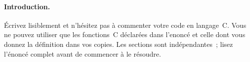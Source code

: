 \documentclass[ds]{sujet}
\begin{document}
\formation{} 
\matiere{}  
\auteur{} 
\def\SujetClsNumero{}
\paragraph{Introduction.}
\'Ecrivez lisiblement et n'h\'esitez pas \`a commenter votre code en
langage~C. 
Vous ne pouvez utiliser que les fonctions~C  d\'eclar\'ees
dans l'enonc\'e et celle dont vous donnez la d\'efinition dans vos copies.
Les sections sont ind\'ependantes~; lisez l'\'enonc\'e
complet avant de commencer \`a le r\'esoudre.




\end{document}
